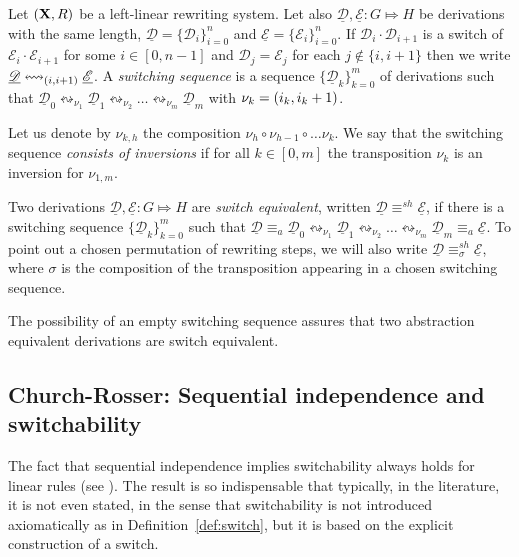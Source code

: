 \documentclass[a4paper,UKenglish,cleveref,pdftex,thm-restate,numberwithinsect]{lipics-v2021}
\newcommand{\interval}[2][1]{\ensuremath{[{#1},{#2}]}}
\def\R{\mathsf{R}}
\def\X{\textbf {\textup{X}}}
\newcommand{\dder}[1]{\mathscr{#1}}
\newcommand{\der}[1]{\underline{\dder{#1}}}
\newcommand{\shift}[1]{\ensuremath{\mathrel{{\leftrightsquigarrow}_{#1}}}}
\begin{document}
\begin{definition}
  \label{de:switch-equivalence}
  Let $(\X, \R)$ be a left-linear rewriting system.  Let also
  $\der{D}, \der{E} : G \Mapsto H$ be derivations with the same
  length, $\der{D}=\{\dder{D}_{i}\}_{i=0}^n$ and
  $\der{E}=\{\dder{E}_{i}\}_{i=0}^n$. If
  $\dder{D}_i \cdot \dder{D}_{i+1}$ is a switch of
  $\dder{E}_i \cdot \dder{E}_{i+1}$ for some $i \in [0,n-1]$ and  $\dder{D}_j = \dder{E}_j$ for each $j \not \in \{i,i+1\}$ then we write
  $\der{D} \shift{\transp{i}} \der{E}$. 
  A \emph{switching sequence} is a sequence $\{\der{D}_{k}\}_{k=0}^m$
  of derivations such that
    $\der{D}_0 \shift{\nu_1} \der{D}_1 \shift{\nu_2} \ldots
    \shift{\nu_m} \der{D}_m$  with $\nu_{k} = \transp{i_k}$.

    Let us denote by $\nu_{k,h}$ the composition
  $\nu_h \circ \nu_{h-1} \circ \ldots \nu_k$. We say that the
  switching sequence \emph{consists of inversions} if for all
  $k \in \interval[0]{m}$ the transposition $\nu_k$ is an inversion
  for $\nu_{1,m}$.
  
  Two derivations $\der{D}, \der{E}:G\Mapsto H$ are \emph{switch
    equivalent}, written $\der{D}\equiv^{sh} \der{E}$, if there is a
  switching sequence $\{\der{D}_{k}\}_{k=0}^m$ such that
  $\der{D}\equiv_a \der{D}_0 \shift{\nu_1} \der{D}_1 \shift{\nu_2}
  \ldots \shift{\nu_m} \der{D}_m \equiv _a \der{E}$.   To point out a chosen permutation of rewriting steps, we will also write $\der{D}\equiv^{sh}_{\sigma} \der{E}$, where $\sigma$ is the composition of the transposition appearing in a chosen switching sequence. 
\end{definition}

\begin{remark}\label{rem:abst}
	The possibility of an empty switching sequence assures that two abstraction equivalent derivations are switch equivalent.
\end{remark}


\subsection{Church-Rosser: Sequential independence and switchability}\label{subsec:CR}


The fact that sequential independence implies switchability always
holds for linear rules (see ). The result is so
indispensable that typically, in the literature, it is not even
stated, in the sense that switchability is not introduced
axiomatically as in Definition~\ref{def:switch}, but it is based on
the explicit construction of a switch.
\end{document}
